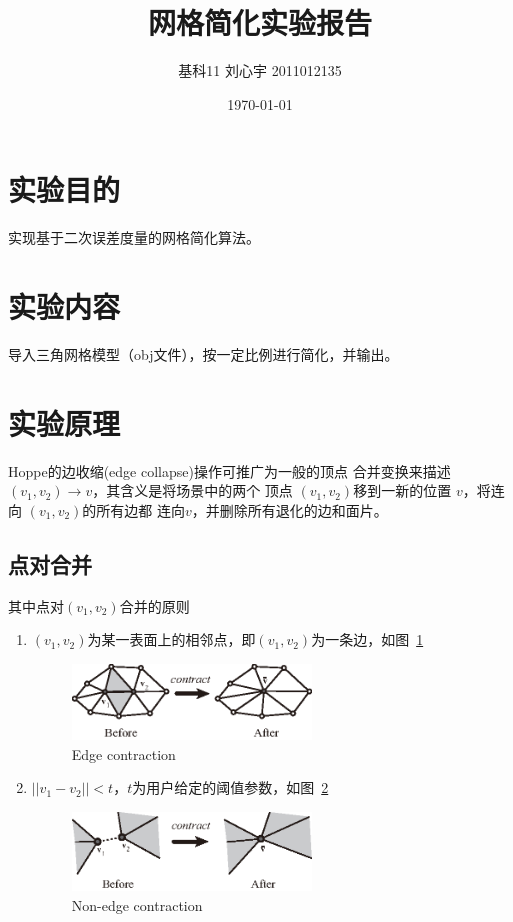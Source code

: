 \documentclass{article}
\title{网格简化实验报告}
\date{\today}
\author{基科11 刘心宇 2011012135}
\makeatletter
\def\maketitle{%
  \begin{center}%
    \vspace{1em}
    \normalfont
    {\sanhao \bf \@title\par}%
    \vspace{2em}   %
    {\xiaosi \@author\par}%
    \vspace{2em}
    {\xiaosi \@date\par}%
    \vspace{4em}
  \end{center}%
  }
\makeatother
\begin{document}
\maketitle
\tableofcontents
\newpage
\section{实验目的}
实现基于二次误差度量的网格简化算法。\cite{garland1997surface}
\section{实验内容}
导入三角网格模型（obj文件），按一定比例进行简化，并输出。
\section{实验原理}
Hoppe的边收缩(edge collapse)操作\cite{hoppe1993mesh,hoppe1996progressive}可推广为一般的顶点
合并变换来描述$(v_1,v_2)\rightarrow v$，其含义是将场景中的两个
顶点 $(v_1,v_2)$移到一新的位置 $v$，将连向 $(v_1,v_2)$的所有边都
连向$v$，并删除所有退化的边和面片。
\subsection{点对合并}
\label{sec:tiaojian}
其中点对$(v_1,v_2)$合并的原则
\begin{enumerate}
\item $(v_1,v_2)$为某一表面上的相邻点，即$(v_1,v_2)$为一条边，如图~\ref{fig:EC}
\begin{figure}[H]
    \centering
    \includegraphics[width=0.6\textwidth]{1.eps}
    \caption{Edge contraction}
    \label{fig:EC}
\end{figure}
\item $||v_1-v_2||<t$，$t$为用户给定的阈值参数，如图~\ref{fig:NEC}
\begin{figure}[H]
    \centering
    \includegraphics[width=0.6\textwidth]{2.eps}
    \caption{Non-edge contraction}
    \label{fig:NEC}
\end{figure}
\end{enumerate}
\end{document}
